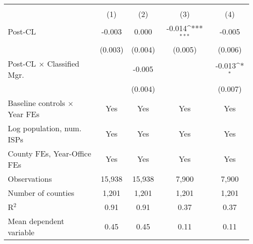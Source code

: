 {
\def\sym#1{\ifmmode^{#1}\else\(^{#1}\)\fi}
\begin{tabular}{l*{4}{c}}
\toprule
                    &&\\\cmidrule(lr){2-3}\cmidrule(lr){4-5}
                    &         &         &         &         \\
\midrule
Post-CL             &      -0.003         &       0.000         &      -0.014\sym{***}&      -0.005         \\
                    &     (0.003)         &     (0.004)         &     (0.005)         &     (0.006)         \\
\addlinespace
Post-CL $\times$ Classified Mgr.&                     &      -0.005         &                     &      -0.013\sym{*}  \\
                    &                     &     (0.004)         &                     &     (0.007)         \\
\addlinespace
Baseline controls $\times$ Year FEs &         Yes         &         Yes         &         Yes         &         Yes         \\
\addlinespace
Log population, num. ISPs &         Yes         &         Yes         &         Yes         &         Yes         \\
\addlinespace
County FEs, Year-Office FEs &         Yes         &         Yes         &         Yes         &         Yes         \\
\midrule
Observations        &      15,938         &      15,938         &       7,900         &       7,900         \\
Number of counties  &       1,201         &       1,201         &       1,201         &       1,201         \\
R$^2$               &        0.91         &        0.91         &        0.37         &        0.37         \\
Mean dependent variable&        0.45         &        0.45         &        0.11         &        0.11         \\
\bottomrule
\end{tabular}
}
